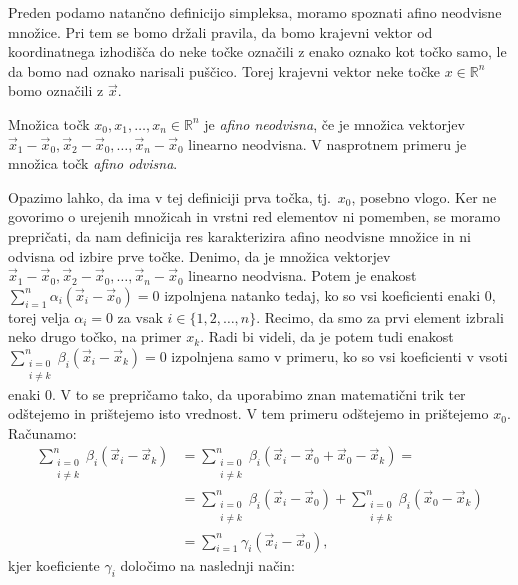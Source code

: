 \documentclass[mat1]{fmfdelo}
\newcommand{\R}{\mathbb R}
\newcommand{\0}{\underline{0}}
\begin{document}
Preden podamo natančno definicijo simpleksa, moramo spoznati afino neodvisne množice. Pri tem se bomo držali pravila, da bomo krajevni vektor od koordinatnega izhodišča do neke točke označili z enako oznako kot točko samo, le da bomo nad oznako narisali puščico. Torej krajevni vektor neke točke $x \in \R^n$ bomo označili z $\vec{x}$.
\begin{definicija}
Množica točk $x_0, x_1, \dots , x_n \in \R^n$ je \emph{afino neodvisna}, če je množica vektorjev $\vec{x}_1 - \vec{x}_0, \vec{x}_2 - \vec{x}_0, \dots , \vec{x}_n - \vec{x}_0$ linearno neodvisna. V nasprotnem primeru je množica točk \emph{afino odvisna}.
\end{definicija}

Opazimo lahko, da ima v tej definiciji prva točka, tj.\ $x_0$, posebno vlogo. Ker ne govorimo o urejenih množicah in vrstni red elementov ni pomemben, se moramo prepričati, da nam definicija res karakterizira afino neodvisne množice in ni odvisna od izbire prve točke. Denimo, da je množica vektorjev $\vec{x}_1 - \vec{x}_0, \vec{x}_2 - \vec{x}_0, \dots , \vec{x}_n - \vec{x}_0$ linearno neodvisna. Potem je enakost $\sum\limits_{i=1}^n \alpha_i (\vec{x}_i - \vec{x}_0) = 0$ izpolnjena natanko tedaj, ko so vsi koeficienti enaki $0$, torej velja $\alpha_i = 0$ za vsak $i \in \{ 1, 2, \dots, n \}$. Recimo, da smo za prvi element izbrali neko drugo točko, na primer $x_k$. Radi bi videli, da je potem tudi enakost $\sum\limits_{\substack{i=0 \\ i\neq k}}^n \beta_i (\vec{x}_i - \vec{x}_k) = 0$ izpolnjena samo v primeru, ko so vsi koeficienti v vsoti enaki $0$. V to se prepričamo tako, da uporabimo znan matematični trik ter odštejemo in prištejemo isto vrednost. V tem primeru odštejemo in prištejemo $x_0$.
Računamo:
\begin{align*} 
\sum\limits_{\substack{i=0 \\ i \neq k}}^n \beta_i (\vec{x}_i - \vec{x}_k) &=  \sum\limits_{\substack{i=0 \\ i \neq k}}^n \beta_i (\vec{x}_i - \vec{x}_0 + \vec{x}_0 - \vec{x}_k) = \\
&=\sum\limits_{\substack{i=0 \\ i\neq k}}^n \beta_i (\vec{x}_i - \vec{x}_0) + \sum\limits_{\substack{i=0 \\ i\neq k}}^n \beta_i (\vec{x}_0 - \vec{x}_k) \\
&= \sum\limits_{i=1}^n \gamma_i (\vec{x}_i - \vec{x}_0),
\end{align*}
kjer koeficiente $\gamma_i$ določimo na naslednji način:
\end{document}
